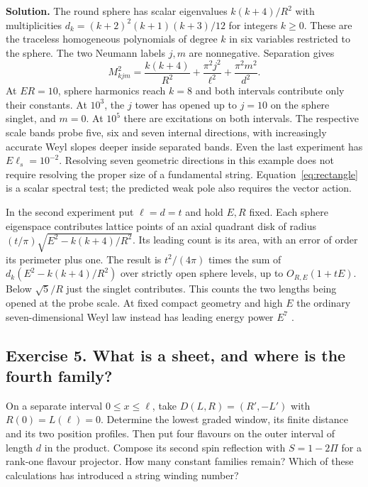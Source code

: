 \documentclass[10pt]{article}
\begin{document}
\noindent\textbf{Solution.}
The round sphere has scalar eigenvalues $k(k+4)/R^2$ with multiplicities $d_k=(k+2)^2(k+1)(k+3)/12$ for integers $k\geq0$. These are the traceless homogeneous polynomials of degree $k$ in six variables restricted to the sphere. The two Neumann labels $j,m$ are nonnegative. Separation gives
\begin{equation}
 M_{kjm}^2=\frac{k(k+4)}{R^2}
            +\frac{\pi^2 j^2}{\ell^2}+\frac{\pi^2 m^2}{d^2}.
 \label{eq:rectangle}
\end{equation}
At $ER=10$, sphere harmonics reach $k=8$ and both intervals contribute only their constants. At $10^3$, the $j$ tower has opened up to $j=10$ on the sphere singlet, and $m=0$. At $10^5$ there are excitations on both intervals. The respective scale bands probe five, six and seven internal directions, with increasingly accurate Weyl slopes deeper inside separated bands. Even the last experiment has $E\ell_s=10^{-2}$. Resolving seven geometric directions in this example does not require resolving the proper size of a fundamental string. Equation~\eqref{eq:rectangle} is a scalar spectral test; the predicted weak pole also requires the vector action.

In the second experiment put $\ell=d=t$ and hold $E,R$ fixed. Each sphere eigenspace contributes lattice points of an axial quadrant disk of radius $(t/\pi)\sqrt{E^2-k(k+4)/R^2}$. Its leading count is its area, with an error of order its perimeter plus one. The result is $t^2/(4\pi)$ times the sum of $d_k(E^2-k(k+4)/R^2)$ over strictly open sphere levels, up to $O_{R,E}(1+tE)$. Below $\sqrt5/R$ just the singlet contributes. This counts the two lengths being opened at the probe scale. At fixed compact geometry and high $E$ the ordinary seven-dimensional Weyl law instead has leading energy power $E^7$ \cite{TwoEndpoint2026,jointnote}.

\subsection{Exercise 5. What is a sheet, and where is the fourth family?}
On a separate interval $0\le x\le\ell$, take $D(L,R)=(R',-L')$ with $R(0)=L(\ell)=0$. Determine the lowest graded window, its finite distance and its two position profiles. Then put four flavours on the outer interval of length $d$ in the product. Compose its second spin reflection with $S=1-2\Pi$ for a rank-one flavour projector. How many constant families remain? Which of these calculations has introduced a string winding number?
\end{document}
